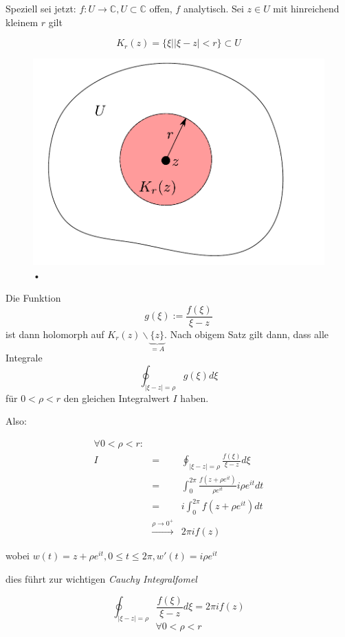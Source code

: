\documentclass[10pt,a4paper]{article}
\begin{document}
Speziell sei jetzt: $f:U \rightarrow \mathbb{C}, U \subset \mathbb{C} $ offen, $f$ analytisch. Sei $z \in U$ mit hinreichend kleinem $r$ gilt

$$K_r(z) = \{ \xi | |\xi - z| < r\} \subset U$$

\begin{figure}[H]
\includegraphics[width=\textwidth]{images/Kumz}
\caption{•}
\end{figure}

Die Funktion $$g(\xi) := \frac{f(\xi)}{\xi-z}$$ ist dann holomorph auf $K_r(z)\backslash\underbrace{\{z\}}_{=A}$. Nach obigem Satz gilt dann, dass alle Integrale $$\oint_{|\xi -z|=\rho} g(\xi) d\xi$$ für $0 < \rho < r$ den gleichen Integralwert $I$ haben.

Also: 

\begin{eqnarray*}
\forall 0 < \rho < r: \\
I &=& \oint_{|\xi-z|=\rho} \frac{f(\xi)}{\xi-z} d\xi \\
&=& \int_{0}^{2\pi} \frac{f(z+\rho e^{it})}{\rho e^{it}} i \rho e^{it} dt \\
&=& i \int_{0}^{2\pi} f(z+\rho e^{it}) dt \\
&\stackrel{\rho \rightarrow 0^{+}}{\rightarrow} & 2 \pi i f(z)
\end{eqnarray*}

wobei $w(t)=z+\rho e^{it} , 0\leq t \leq 2\pi, w'(t)=i\rho e^{it}$

dies führt zur wichtigen \emph{Cauchy Integralfomel}

\begin{defi}
$$ \oint_{|\xi-z|=\rho} \frac{f(\xi)}{\xi-z} d \xi = 2 \pi i f(z)$$
$$ \forall 0 < \rho < r$$
\end{defi}
\end{document}
